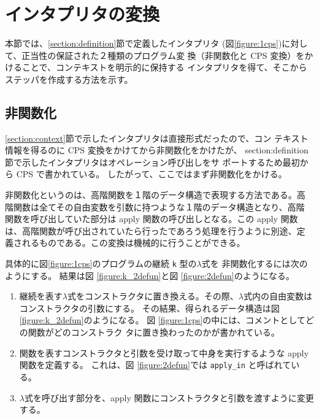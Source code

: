 \section{インタプリタの変換}
\label{section:transform}

本節では、\ref{section:definition}節で定義したインタプリタ
(図\ref{figure:1cps})に対して、正当性の保証された２種類のプログラム変
換（非関数化と CPS 変換）をかけることで、コンテキストを明示的に保持する
インタプリタを得て、そこからステッパを作成する方法を示す。


\subsection{非関数化}
\label{section:2defun}

\ref{section:context}節で示したインタプリタは直接形式だったので、コン
テキスト情報を得るのに CPS 変換をかけてから非関数化をかけたが、
{section:definition}節で示したインタプリタはオペレーション呼び出しをサ
ポートするため最初から CPS で書かれている。
したがって、ここではまず非関数化をかける。

非関数化というのは、高階関数を１階のデータ構造で表現する方法である。高
階関数は全てその自由変数を引数に持つような１階のデータ構造となり、高階
関数を呼び出していた部分は apply 関数の呼び出しとなる。この apply 関数
は、高階関数が呼び出されていたら行ったであろう処理を行うように別途、定
義されるものである。この変換は機械的に行うことができる。

具体的に図\ref{figure:1cps}のプログラムの継続 \texttt{k} 型の$\lambda$式を
非関数化するには次のようにする。
結果は図 \ref{figure:k_2defun}と図 \ref{figure:2defun}のようになる。

\begin{enumerate}
\item 継続を表す$\lambda$式をコンストラクタに置き換える。その際、$\lambda$式内の自由変数はコンストラクタの引数にする。
その結果、得られるデータ構造は図 \ref{figure:k_2defun}のようになる。
図 \ref{figure:1cps}の中には、コメントとしてどの関数がどのコンストラク
タに置き換わったのかが書かれている。
\item 関数を表すコンストラクタと引数を受け取って中身を実行するような apply 関数を定義する。
これは、図 \ref{figure:2defun}では \texttt{apply\_in} と呼ばれている。
\item $\lambda$式を呼び出す部分を、apply 関数にコンストラクタと引数を渡すように変更する。
\end{enumerate}

